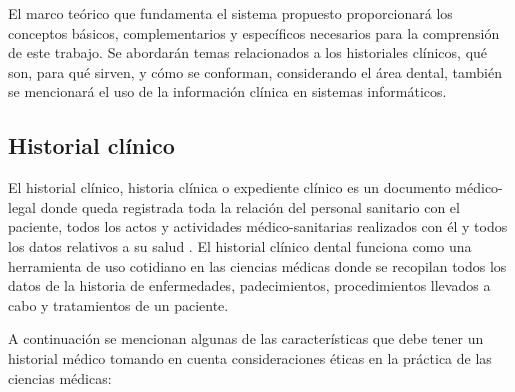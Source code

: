 El marco teórico que fundamenta el sistema propuesto proporcionará los conceptos básicos, complementarios y específicos necesarios para la comprensión de este trabajo. Se abordarán temas relacionados a los historiales clínicos, qué son, para qué sirven, y cómo se conforman, considerando el área dental, también se mencionará el uso de la información clínica en sistemas informáticos.

\subsection{Historial clínico}

El historial clínico, historia clínica o expediente clínico es un documento médico-legal donde queda registrada toda la relación del personal sanitario con el paciente, todos los actos y actividades médico-sanitarias realizados con él y todos los datos relativos a su salud \cite{E03}. El historial clínico dental funciona como una herramienta de uso cotidiano en las ciencias médicas donde se recopilan todos los datos de la historia de enfermedades, padecimientos, procedimientos llevados a cabo y tratamientos de un paciente.

\vspace{1em}

A continuación se mencionan algunas de las características que debe tener un historial médico tomando en cuenta consideraciones éticas en la práctica de las ciencias médicas:

